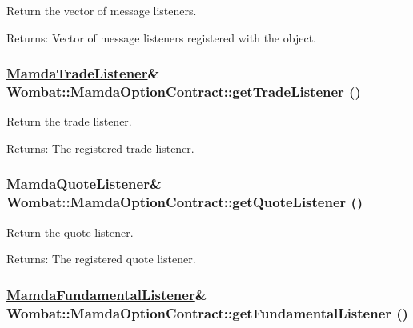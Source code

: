 Return the vector of message listeners. 

\begin{Desc}
\item[Returns:]Vector of message listeners registered with the object. \end{Desc}
\hypertarget{classWombat_1_1MamdaOptionContract_f6640ac35d15df14e4b044597f4bf7d0}{
\subsubsection[getTradeListener]{\setlength{\rightskip}{0pt plus 5cm}\hyperlink{classWombat_1_1MamdaTradeListener}{Mamda\-Trade\-Listener}\& Wombat::Mamda\-Option\-Contract::get\-Trade\-Listener ()}}
\label{classWombat_1_1MamdaOptionContract_f6640ac35d15df14e4b044597f4bf7d0}


Return the trade listener. 

\begin{Desc}
\item[Returns:]The registered trade listener. \end{Desc}
\hypertarget{classWombat_1_1MamdaOptionContract_956e06dfe57a24b8bfff64fbe6e8e111}{
\subsubsection[getQuoteListener]{\setlength{\rightskip}{0pt plus 5cm}\hyperlink{classWombat_1_1MamdaQuoteListener}{Mamda\-Quote\-Listener}\& Wombat::Mamda\-Option\-Contract::get\-Quote\-Listener ()}}
\label{classWombat_1_1MamdaOptionContract_956e06dfe57a24b8bfff64fbe6e8e111}


Return the quote listener. 

\begin{Desc}
\item[Returns:]The registered quote listener. \end{Desc}
\hypertarget{classWombat_1_1MamdaOptionContract_f5397ed9eaea7471258ccdbdd85fc000}{
\subsubsection[getFundamentalListener]{\setlength{\rightskip}{0pt plus 5cm}\hyperlink{classWombat_1_1MamdaFundamentalListener}{Mamda\-Fundamental\-Listener}\& Wombat::Mamda\-Option\-Contract::get\-Fundamental\-Listener ()}}
\label{classWombat_1_1MamdaOptionContract_f5397ed9eaea7471258ccdbdd85fc000}


